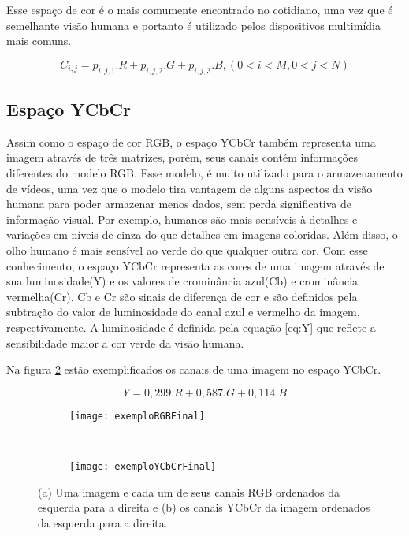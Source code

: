 Esse espaço de cor é o mais comumente encontrado no cotidiano, uma vez que é semelhante visão humana e portanto é utilizado pelos dispositivos multimídia mais comuns.
	
	\begin{equation}
			C_{i,j} = p_{i,j,1} . R + p_{i,j,2} . G + p_{i,j,3} . B ,  (0<i<M, 0<j<N)
	\label{eq:corRGB}
	\end{equation}

\subsection{Espaço YCbCr}

Assim como o espaço de cor RGB, o espaço YCbCr também representa uma imagem através de três matrizes, porém, seus canais contém informações diferentes do modelo RGB. Esse modelo, é muito utilizado para o armazenamento de vídeos, uma vez que o modelo tira vantagem de alguns aspectos da visão humana para poder armazenar menos dados, sem perda significativa de informação visual. Por exemplo, humanos são mais sensíveis à detalhes e variações em níveis de cinza do que detalhes em imagens coloridas. Além disso, o olho humano é mais sensível ao verde do que qualquer outra cor\cite{colorSpacesDigitalVideo}. Com esse conhecimento, o espaço YCbCr representa as cores de uma imagem através de sua luminosidade(Y) e os valores de crominância azul(Cb) e crominância vermelha(Cr). Cb e Cr são sinais de diferença de cor e são definidos pela subtração do valor de luminosidade do canal azul e vermelho da imagem, respectivamente. A luminosidade é definida pela equação \ref{eq:Y}\cite{LivroVideoDigital} que reflete a sensibilidade maior a cor verde da visão humana.

Na figura \ref{fig:Espacos:sub:YCbCr} estão exemplificados os canais de uma imagem no espaço YCbCr.

\begin{equation}
	Y = 0,299.R + 0,587.G + 0,114.B
\label{eq:Y}
\end{equation}


\begin{figure}
 \centering
\begin{subfigure}{.5\textwidth}
  \centering
  \texttt{[image: exemploRGBFinal]}
	\caption{}
	\label{fig:Espacos:sub:RGB}
\end{subfigure}\
\begin{subfigure}{.5\textwidth}
  \centering
  \texttt{[image: exemploYCbCrFinal]}
	\caption{}
	\label{fig:Espacos:sub:YCbCr}
\end{subfigure}
\caption{(a) Uma imagem e cada um de seus canais RGB ordenados da esquerda para a direita e (b) os canais YCbCr da imagem ordenados da esquerda para a direita.}
\label{fig:Espacos}
\end{figure}

